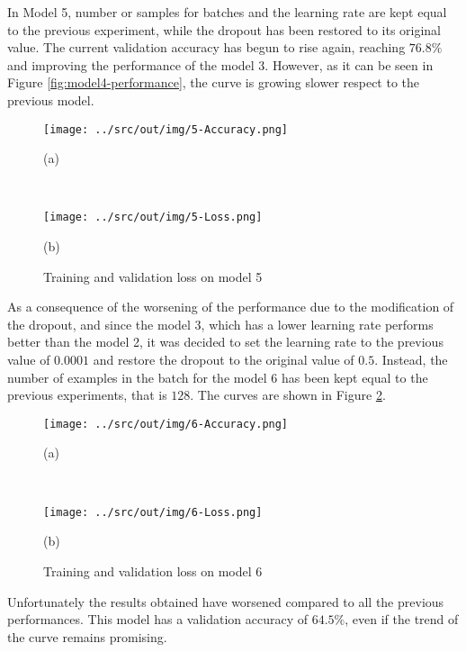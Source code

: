 \documentclass[a4paper,12pt]{article} %
\begin{document}
	In Model 5, number or samples for batches and the learning rate are kept 
	equal to the previous experiment, while the dropout has been restored to 
	its original value. 
	The current validation accuracy has begun to rise again, reaching $76.8\%$ 
	and improving the performance of the model 3. However, as it can be seen in 
	Figure \ref{fig:model4-performance}, the curve is growing slower respect to 
	the previous model.
	
	\begin{figure}[htb]
		\begin{minipage}[c]{.49\textwidth}
			\centering
			\texttt{[image: ../src/out/img/5-Accuracy.png]}
			\caption*{(a)}
		\end{minipage}
		~
		\begin{minipage}[c]{.49\textwidth}
			\centering
			\texttt{[image: ../src/out/img/5-Loss.png]}
			\caption*{(b)}
		\end{minipage}
		\caption{Training and validation loss on model 5}
		\label{fig:model5-performance}
	\end{figure}

	As a consequence of the worsening of the performance due to the 
	modification of the dropout, and since the model 3, which has a lower 
	learning rate performs better than the model 2, it was decided to set 
	the learning rate to the previous value of $0.0001$ and restore the dropout 
	to the original value of $0.5$. Instead, the number of examples in the 
	batch for the model 6 has been kept equal to the previous experiments, that 
	is $128$. 
	The curves are shown in Figure \ref{fig:model6-performance}.
		
	\begin{figure}[H]
		\begin{minipage}[c]{.49\textwidth}
			\centering
			\texttt{[image: ../src/out/img/6-Accuracy.png]}
			\caption*{(a)}
		\end{minipage}
		~
		\begin{minipage}[c]{.49\textwidth}
			\centering
			\texttt{[image: ../src/out/img/6-Loss.png]}
			\caption*{(b)}
		\end{minipage}
		\caption{Training and validation loss on model 6}
		\label{fig:model6-performance}
	\end{figure}

	Unfortunately the results obtained have worsened compared to all the 
	previous performances. This model has a validation accuracy of $64.5\%$, 
	even if the trend of the curve remains promising.
	
\end{document}

